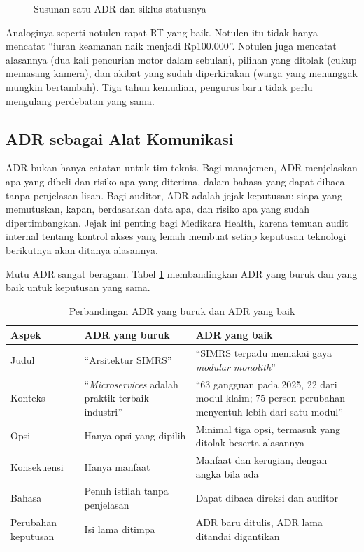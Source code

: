 \begin{figure}[!htb]
  \centering
  
  \caption{Susunan satu ADR dan siklus statusnya}
  \label{fig:ch07-struktur-adr}
\end{figure}

Analoginya seperti notulen rapat RT yang baik. Notulen itu tidak hanya mencatat ``iuran keamanan
naik menjadi Rp100.000''. Notulen juga mencatat alasannya (dua kali pencurian motor dalam sebulan),
pilihan yang ditolak (cukup memasang kamera), dan akibat yang sudah diperkirakan (warga yang menunggak
mungkin bertambah). Tiga tahun kemudian, pengurus baru tidak perlu mengulang perdebatan yang sama.

\subsection{ADR sebagai Alat Komunikasi}

ADR bukan hanya catatan untuk tim teknis. Bagi manajemen, ADR menjelaskan apa yang dibeli dan
risiko apa yang diterima, dalam bahasa yang dapat dibaca tanpa penjelasan lisan. Bagi auditor, ADR
adalah jejak keputusan: siapa yang memutuskan, kapan, berdasarkan data apa, dan risiko apa yang
sudah dipertimbangkan. Jejak ini penting bagi Medikara Health, karena temuan audit internal tentang
kontrol akses yang lemah membuat setiap keputusan teknologi berikutnya akan ditanya alasannya.

Mutu ADR sangat beragam. Tabel \ref{tab:ch07-adr-baik-buruk} membandingkan ADR yang buruk dan yang
baik untuk keputusan yang sama.

\begin{table}[!htb]
  \centering
  \caption{Perbandingan ADR yang buruk dan ADR yang baik}
  \label{tab:ch07-adr-baik-buruk}
  \footnotesize
  \begin{tabularx}{\textwidth}{>{\raggedright\arraybackslash}p{2.3cm} >{\raggedright\arraybackslash}X >{\raggedright\arraybackslash}X}
    \hline
    \textbf{Aspek} & \textbf{ADR yang buruk} & \textbf{ADR yang baik} \\ \hline
    Judul & ``Arsitektur SIMRS'' & ``SIMRS terpadu memakai gaya \textit{modular monolith}'' \\
      \hline
    Konteks & ``\textit{Microservices} adalah praktik terbaik industri'' & ``63 gangguan pada 2025,
      22 dari modul klaim; 75 persen perubahan menyentuh lebih dari satu modul'' \\ \hline
    Opsi & Hanya opsi yang dipilih & Minimal tiga opsi, termasuk yang ditolak beserta alasannya \\
      \hline
    Konsekuensi & Hanya manfaat & Manfaat dan kerugian, dengan angka bila ada \\ \hline
    Bahasa & Penuh istilah tanpa penjelasan & Dapat dibaca direksi dan auditor \\ \hline
    Perubahan keputusan & Isi lama ditimpa & ADR baru ditulis, ADR lama ditandai digantikan \\
      \hline
  \end{tabularx}
\end{table}

